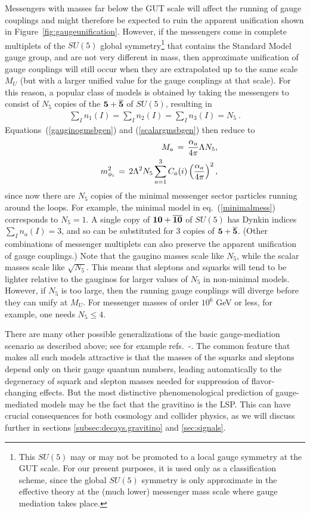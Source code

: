 \documentclass[12pt]{article}
\def\beq{\begin{eqnarray}}
\def\eeq{\end{eqnarray}}
\def\nmess{N_5}
\begin{document}
Messengers with masses far below the GUT scale will affect the running of 
gauge couplings and might therefore be expected to ruin the apparent 
unification shown in Figure~\ref{fig:gaugeunification}. However, if the 
messengers come in complete multiplets of the $SU(5)$ global 
symmetry\footnote{This $SU(5)$ may or may not be promoted to a local gauge 
symmetry at the GUT scale. For our present purposes, it is used only as 
a classification scheme, since the global $SU(5)$ symmetry is only 
approximate in the effective theory at the (much lower) messenger mass 
scale where gauge mediation takes place.} that contains the Standard Model 
gauge group, and are not very different in mass, then approximate 
unification of gauge couplings will still occur when they are extrapolated 
up to the same scale $M_U$ (but with a larger unified value for the gauge 
couplings at that scale). For this reason, a popular class of models is 
obtained by taking the messengers to consist of $\nmess$ copies of the 
${\bf 5}+{\bf \overline 5}$ of $SU(5)$, resulting in
\beq
\sum_I n_1(I) = \sum_I n_2(I) =\sum_I n_3(I) = \nmess\> .
\eeq  
Equations~(\ref{gauginogmsbgen}) and
(\ref{scalargmsbgen}) then reduce to 
\beq
&&M_a \,=\, {\alpha_a \over 4 \pi} \Lambda \nmess ,
\label{gmsbgauginonmess}\\
&&m^2_{\phi_i} \,=\, 2 \Lambda^2 \nmess
\sum_{a=1}^3 C_a(i) \left ({\alpha_a\over 4\pi}\right )^2 ,
\label{gmsbnmess}
\eeq
since now there are $\nmess$ copies of the minimal messenger sector 
particles running around the loops. For example, the minimal model in 
eq.~(\ref{minimalmess}) corresponds to $\nmess = 1$. A single copy of 
${\bf 10} + {\bf \overline{ 10}}$ of $SU(5)$ has Dynkin indices $\sum_I 
n_a(I) = 3$, and so can be substituted for 3 copies of ${\bf 5}+{\bf 
\overline 5}$. (Other combinations of messenger multiplets can also 
preserve the apparent unification of gauge couplings.) Note that the 
gaugino masses scale like $\nmess$, while the scalar masses scale like 
$\sqrt{\nmess}$. This means that sleptons and squarks will tend to be 
lighter relative to the gauginos for larger values of $\nmess$ in 
non-minimal models. However, if $\nmess$ is too large, then the running 
gauge couplings will diverge before they can unify at $M_U$. For messenger 
masses of order $10^6$ GeV or less, for example, one needs $\nmess\leq 4$.

There are many other possible generalizations of the basic gauge-mediation 
scenario as described above; see for example 
refs.~\cite{gmsbcorrB}-\cite{GGMb}. The common feature that makes all such models 
attractive is that the masses of the squarks and sleptons depend only on 
their gauge quantum numbers, leading automatically to the degeneracy of 
squark and slepton masses needed for suppression of flavor-changing 
effects. But the most distinctive phenomenological prediction of 
gauge-mediated models may be the fact that the gravitino is the LSP. This 
can have crucial consequences for both cosmology and collider physics, as 
we will discuss further in sections \ref{subsec:decays.gravitino} and 
\ref{sec:signals}.
\end{document}
